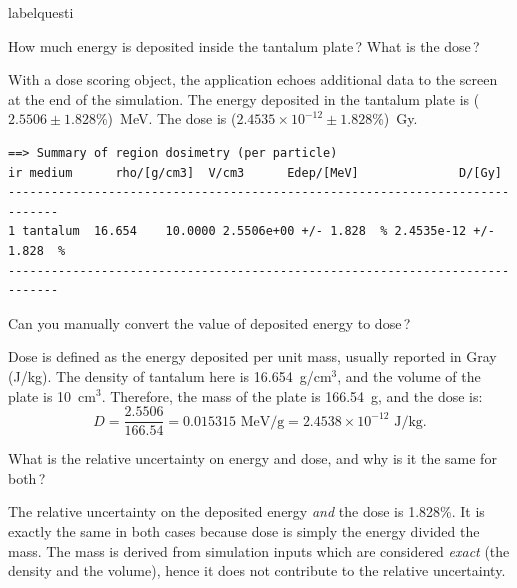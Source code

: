 \documentclass[12pt,twoside]{article}
\makeatletter
\renewcommand\thequesti         {\@arabic\c@questi}
\newenvironment{question}{
    \bfseries
    \edef\@questictr{questi}
    \expandafter
    \list \csname label\@questictr\endcsname {
        \usecounter\@questictr\def\makelabel##1{\hss\llap{##1}}
        \savebox{\questbox}             {\thequesti}
        \setlength\labelsep             {0.6em}
        \setlength\labelwidth           {\wd\questbox}
        \setlength\leftmargini          {\labelwidth}
        \addtolength{\leftmargini}      {\labelsep}
        \addtolength{\leftmargini}      {0.2em}
        \leftmargin\leftmargini
        \setlength\topsep               {1em}
        \setlength\itemsep              {1.2em}
        \setlength\parsep               {0.5em}
    }
}{\normalfont\endlist}
\newenvironment{answer}{\normalfont}{\relax}
\makeatother
\begin{document}
\begin{question}

\item How much energy is deposited inside the tantalum plate\,? What is
the dose\,?

\begin{answer}
With a dose scoring object, the application echoes additional data to the
screen at the end of the simulation. The energy deposited in the
tantalum plate is ($2.5506\pm1.828$\%)~MeV. The dose is
($2.4535\times10^{-12}\pm1.828$\%)~Gy.

{\scriptsize
\begin{lstlisting}[language={},backgroundcolor=\color{white}]
==> Summary of region dosimetry (per particle)
ir medium      rho/[g/cm3]  V/cm3      Edep/[MeV]              D/[Gy]
-----------------------------------------------------------------------------
1 tantalum  16.654    10.0000 2.5506e+00 +/- 1.828  % 2.4535e-12 +/- 1.828  %
-----------------------------------------------------------------------------
\end{lstlisting}
}
\end{answer}

\clearpage
\item Can you manually convert the value of deposited energy to dose\,?

\begin{answer}
Dose is defined as the energy deposited per unit mass, usually reported
in Gray (J/kg). The density of tantalum here is 16.654~g/cm$^3$, and
the volume of the plate is 10~cm$^3$. Therefore, the mass of the plate
is 166.54~g, and the dose is:
\begin{equation*}
D = \frac{2.5506}{166.54} = 0.015315 \text{\ MeV/g} = 2.4538
\times 10^{-12} \text{\ J/kg}.
\end{equation*}

\end{answer}

\item What is the relative uncertainty on energy and dose, and why is
it the same for both\,?

\begin{answer}
The relative uncertainty on the deposited energy \textit{and} the dose
is 1.828\%. It is exactly the same in both cases because dose is
simply the energy divided the mass. The mass is derived from simulation
inputs which are considered \textit{exact} (the density and the volume),
hence it does not contribute to the relative uncertainty.
\end{answer}


\end{question}
\end{document}
